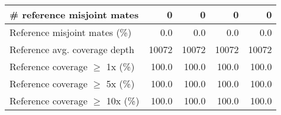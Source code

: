 \documentclass[12pt,a4paper]{article}
\begin{document}
\begin{table}[ht]
\begin{center}
\begin{tabular}{|l*{4}{|r}|}
\# reference misjoint mates & 0 & 0 & 0 & 0 \\ \hline
Reference misjoint mates (\%) & 0.0 & 0.0 & 0.0 & 0.0 \\ \hline
Reference avg. coverage depth & 10072 & 10072 & 10072 & 10072 \\ \hline
Reference coverage $\geq$ 1x (\%) & 100.0 & 100.0 & 100.0 & 100.0 \\ \hline
Reference coverage $\geq$ 5x (\%) & 100.0 & 100.0 & 100.0 & 100.0 \\ \hline
Reference coverage $\geq$ 10x (\%) & 100.0 & 100.0 & 100.0 & 100.0 \\ \hline
\end{tabular}
\end{center}
\end{table}
\end{document}

